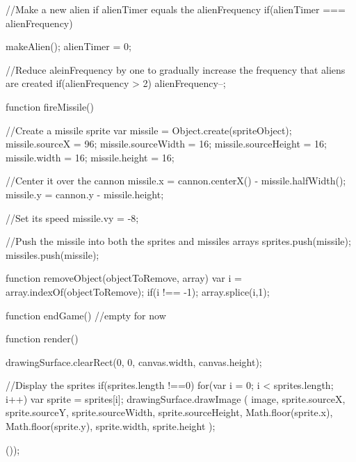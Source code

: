 {{		//Make a new alien if alienTimer equals the alienFrequency
		if(alienTimer === alienFrequency)
		{
			makeAlien();
			alienTimer = 0;
			
			//Reduce aleinFrequency by one to gradually increase the frequency that aliens are created
			if(alienFrequency > 2)
			{
				alienFrequency--;
			}
		}
	
		
		function fireMissile()
		{
			//Create a missile sprite
			var missile = Object.create(spriteObject);
			missile.sourceX = 96;
			missile.sourceWidth = 16;
			missile.sourceHeight = 16;
			missile.width = 16;
			missile.height = 16;
		
			//Center it over the cannon
			missile.x = cannon.centerX() - missile.halfWidth();
			missile.y = cannon.y - missile.height;
	
			//Set its speed
			missile.vy = -8;
	
			//Push the missile into both the sprites and missiles arrays
			sprites.push(missile);
			missiles.push(missile);
		}
	}
	
	function removeObject(objectToRemove, array)
	{
		var i = array.indexOf(objectToRemove);
		if(i !== -1);
		{
			array.splice(i,1);
		}
	}
	
	function endGame()
	{
		//empty for now
	}
	
	function render()
	{
		drawingSurface.clearRect(0, 0, canvas.width, canvas.height);
		
		//Display the sprites
		if(sprites.length !==0)
		{
			for(var i = 0; i < sprites.length; i++)
			{
				var sprite = sprites[i];
				drawingSurface.drawImage
				(
					image,
					sprite.sourceX, sprite.sourceY,
					sprite.sourceWidth, sprite.sourceHeight,
					Math.floor(sprite.x), Math.floor(sprite.y),
					sprite.width, sprite.height
				);
			}
		}
	}
	
}());